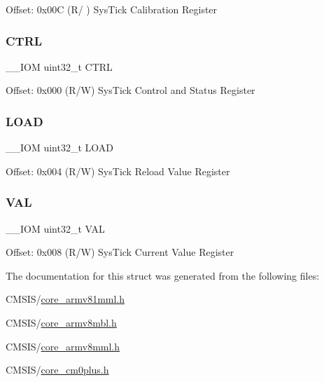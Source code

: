 Offset\+: 0x00C (R/ ) Sys\+Tick Calibration Register \mbox{\label{struct_sys_tick___type_ac81efc171e9852a36caeb47122bfec5b}} 
\subsubsection{\texorpdfstring{CTRL}{CTRL}}
{\footnotesize\ttfamily \+\_\+\+\_\+\+I\+OM uint32\+\_\+t C\+T\+RL}

Offset\+: 0x000 (R/W) Sys\+Tick Control and Status Register \mbox{\label{struct_sys_tick___type_a0c1333686137b7e25a46bd548a5b5bc3}} 
\subsubsection{\texorpdfstring{LOAD}{LOAD}}
{\footnotesize\ttfamily \+\_\+\+\_\+\+I\+OM uint32\+\_\+t L\+O\+AD}

Offset\+: 0x004 (R/W) Sys\+Tick Reload Value Register \mbox{\label{struct_sys_tick___type_ae7a655a853654127f3dfb7fa32c3f457}} 
\subsubsection{\texorpdfstring{VAL}{VAL}}
{\footnotesize\ttfamily \+\_\+\+\_\+\+I\+OM uint32\+\_\+t V\+AL}

Offset\+: 0x008 (R/W) Sys\+Tick Current Value Register 

The documentation for this struct was generated from the following files\+:\begin{DoxyCompactItemize}
\item 
C\+M\+S\+I\+S/\mbox{\hyperlink{core__armv81mml_8h}{core\+\_\+armv81mml.\+h}}\item 
C\+M\+S\+I\+S/\mbox{\hyperlink{core__armv8mbl_8h}{core\+\_\+armv8mbl.\+h}}\item 
C\+M\+S\+I\+S/\mbox{\hyperlink{core__armv8mml_8h}{core\+\_\+armv8mml.\+h}}\item 
C\+M\+S\+I\+S/\mbox{\hyperlink{core__cm0plus_8h}{core\+\_\+cm0plus.\+h}}\end{DoxyCompactItemize}
